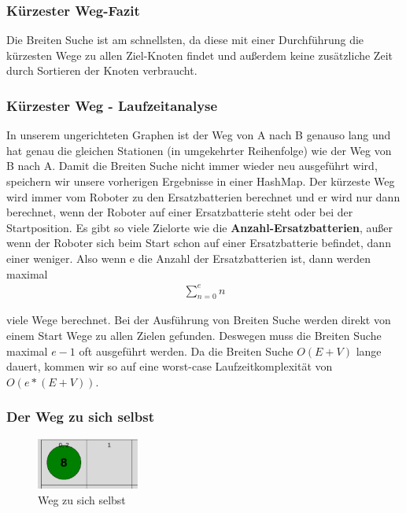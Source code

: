 \documentclass[a4paper,12pt,arial]{scrartcl}
\begin{document}
\subsubsection{Kürzester Weg-Fazit}


Die Breiten Suche ist am schnellsten, da diese mit einer Durchführung die kürzesten Wege zu allen Ziel-Knoten findet und außerdem keine zusätzliche Zeit durch Sortieren der Knoten verbraucht.



\par

\subsubsection{Kürzester Weg - Laufzeitanalyse}
In unserem ungerichteten Graphen ist der Weg von A nach B genauso lang und hat genau die gleichen Stationen (in umgekehrter Reihenfolge) wie der Weg von B nach A.
Damit die Breiten Suche nicht immer wieder neu ausgeführt wird, speichern wir unsere vorherigen Ergebnisse in einer HashMap. 
Der kürzeste Weg wird immer vom Roboter zu den Ersatzbatterien berechnet und er wird nur dann berechnet, wenn der Roboter auf einer Ersatzbatterie steht oder bei der Startposition.
Es gibt so viele Zielorte wie die \textbf{Anzahl-Ersatzbatterien}, außer wenn der Roboter sich beim Start schon auf einer Ersatzbatterie befindet, dann einer weniger.
Also wenn e die Anzahl der Ersatzbatterien ist, dann werden maximal
\begin{align*}
    \sum_{n=0}^{e} n
\end{align*}

viele Wege berechnet.
Bei der Ausführung von Breiten Suche werden direkt von einem Start Wege zu allen Zielen gefunden. Deswegen muss die Breiten Suche maximal $e-1$ oft ausgeführt werden. Da die Breiten Suche $O(E+V)$ lange dauert, kommen wir so auf eine worst-case Laufzeitkomplexität von $O(e * (E + V))$.

\subsubsection{Der Weg zu sich selbst}
\begin{figure}
    \centering
    \includegraphics[width=0.3\textwidth]{way_to_self.pdf}
    \caption{Weg zu sich selbst}
    \label{fig:way_to_self}
\end{figure}
\end{document}
